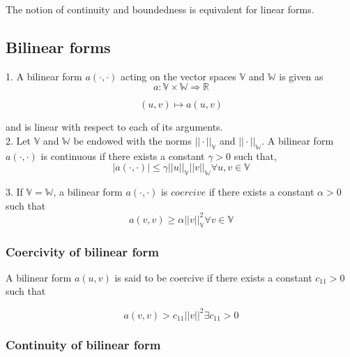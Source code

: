 \documentclass[a4paper,12pt]{book}
\begin{document}
The notion of continuity and boundedness is equivalent for linear forms.

\subsection{Bilinear forms}

1. A bilinear form $a(\cdot,\cdot)$ acting on the vector spaces $\mathbb{V}$ and $\mathbb{W}$ is given as\\
\begin{equation}
a : \mathbb{V} \times \mathbb{W} \Rightarrow \mathbb{R}
\end{equation}

\begin{equation}
(u,v) \mapsto a(u,v)
\end{equation}

and is linear with respect to each of its arguments.\\

2. Let $\mathbb{V}$ and $\mathbb{W}$ be endowed with the norms $||\cdot||_\mathbb{V}$ and $||\cdot||_\mathbb{W}$. A bilinear form $a(\cdot,\cdot)$ is continuous if there exists a constant $\gamma > 0$ such that,\\
\begin{equation}
|a(\cdot,\cdot)| \leq \gamma ||u||_\mathbb{V} ||v||_\mathbb{W} \forall u,v \in \mathbb{V}
\end{equation}

3. If $\mathbb{V} = \mathbb{W}$, a bilinear form $a(\cdot,\cdot)$ is $coercive$ if there exists a constant $\alpha > 0$ such that \\
\begin{equation}
a(v,v) \geq \alpha ||v||_\mathbb{V}^2 \forall v \in \mathbb{V}
\end{equation}

\subsubsection{Coercivity of bilinear form} \label{Coercivity_constant}

A bilinear form $a(u,v)$ is said to be coercive if there exists a constant $c_{11} > 0$ such that

\begin{equation}\label{Coercivity}
a(v,v) > c_{11} ||v||^2   \exists   c_{11} > 0
\end{equation}

\subsubsection{Continuity of bilinear form}
\end{document}
